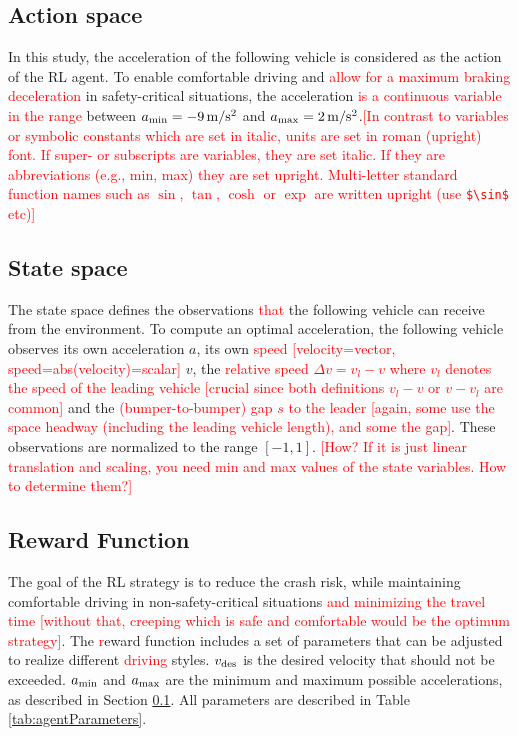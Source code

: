 \documentclass[review]{elsarticle}
\providecommand{\red}[1]{\textcolor{red}{#1}}
\providecommand{\martin}[1]{\red{#1}} %
\begin{document}
\subsection{Action space}
\label{actionSpace}
In this study, the acceleration of the following vehicle is considered
as the action of the RL agent. To enable comfortable driving and
\martin{allow for a maximum braking deceleration} in safety-critical
situations, the acceleration \martin{is a continuous variable in the
  range} between $a_{\rm min} = \unit[-9]{m/s^2}$ and 
$a_{\rm max} =\unit[2]{m/s^2}$.\martin{[In contrast to variables or symbolic
    constants which are set in italic, units are set in roman
    (upright) font. If super- or subscripts are variables, they are
    set italic. If they are abbreviations (e.g., min, max) they are set
    upright. Multi-letter standard function names such as $\sin$,
    $\tan$, $\cosh$ or $\exp$ are written upright (use
    \texttt{\$\textbackslash sin\$} etc)]}


\subsection{State space}
The state space defines the observations \martin{that} the following
vehicle can receive from the environment. To compute an optimal
acceleration, the following vehicle observes its own acceleration $a$,
its own \martin{speed [velocity=vector, speed=abs(velocity)=scalar]}
$v$, the \martin{relative speed $\Delta v=v_l-v$ where $v_l$ denotes
  the speed of the leading vehicle [crucial since both definitions
    $v_l-v$ or $v-v_l$ are common]} and the \martin{(bumper-to-bumper)
  gap $s$ to the leader [again, some use the space headway (including
    the leading vehicle length), and some the gap]}. These
observations are normalized to the range $[-1,1]$. \martin{[How? If it
    is just linear translation and scaling, you need min and max
    values of the state variables. How to determine them?]}


\subsection{Reward Function}
\label{rewardFunction}
The goal of the RL strategy is to reduce the crash risk, while
maintaining comfortable driving in non-safety-critical situations
\martin{and minimizing the travel time [without that, creeping which
    is safe and comfortable would be the optimum strategy]}. The
\martin{r}eward function includes a set of parameters that can be
adjusted to realize different \martin{driving} styles. $v_{\rm des}$
is the desired velocity that should not be exceeded. $a_{\rm min}$ and $a_{\rm max}$ are the minimum and maximum possible accelerations, as described in Section \ref{actionSpace}. All parameters are described in Table \ref{tab:agentParameters}.
\end{document}
